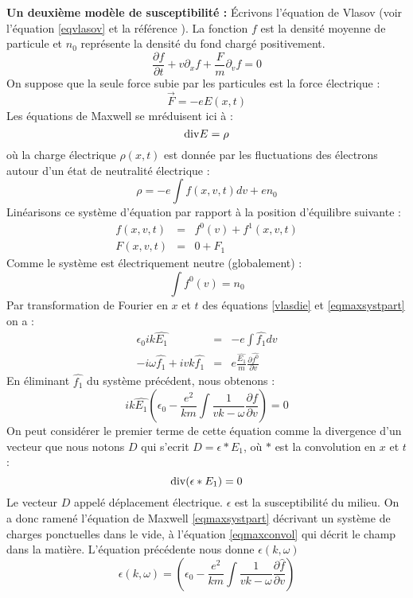 \documentclass[12pt]{book}
\begin{document}
\begin{exmp}{\bf Un deuxi\`eme mod\`ele de susceptibilit\'e :}
\'Ecrivons l'\'equation de Vlasov (voir l'\'equation \ref{eqvlasov} et la
r\'ef\'erence \cite{ph:physt:Diu89}).
La fonction $f$ est la densit\'e moyenne de particule et $n_0$
repr\'esente la densit\'e du fond charg\'e positivement.
\begin{equation}\label{vlasdie}
\frac{\partial f}{\partial t}+{v}\partial_x f+\frac{F}{m}\partial_v f= 0
\end{equation}
On suppose que la seule force subie par les particules est la force
\'electrique :
\begin{equation}
\vec{F}=-eE(x,t)
\end{equation}
Les \'equations de Maxwell se mr\'eduisent ici \`a :
\begin{equation}\label{eqmaxsystpart}
{\rm div} E=\rho
\end{equation}
o\`u la charge \'electrique $\rho(x,t)$ est donn\'ee par les fluctuations des
\'electrons autour d'un \'etat de neutralit\'e \'electrique :
\begin{equation}
\rho=-e\int f(x,v,t)dv+en_0
\end{equation}
Lin\'earisons ce syst\`eme d'\'equation par rapport \`a la position
d'\'equilibre suivante :
\begin{eqnarray}
f(x,v,t)&=&f^0(v)+f^1(x,v,t)\nonumber\\
F(x,v,t)&=&0+F_1
\end{eqnarray}
Comme le syst\`eme est \'electriquement neutre (globalement) :
\begin{equation}
\int f^0(v) = n_0
\end{equation}
Par transformation de Fourier en $x$ et $t$ des \'equations \ref{vlasdie} et
\ref{eqmaxsystpart} on a :
\begin{eqnarray}
\epsilon_0 ik \hat{E_1}&=&-e\int \hat{f_1} dv\\
-i\omega \hat{f_1}+ivk\hat{f_1}&=&e\frac{\hat{E_1}}{m} \frac{\partial
\hat{f^0}}{\partial v} 
\end{eqnarray}
En \'eliminant $\hat{f_1}$ du syst\`eme pr\'ec\'edent, nous obtenons :
\begin{equation}
ik\hat{E_1}(\epsilon_0 - \frac{e^2}{km}\int
\frac{1}{vk-\omega}\frac{\partial f}{\partial v})=0
\end{equation}
On peut consid\'erer le premier terme de cette \'equation comme la
divergence d'un vecteur que nous notons $D$ qui s'ecrit $D=\epsilon
*E_1$, o\`u $*$ est la convolution en $x$ et $t$ :
\begin{equation}\label{eqmaxconvol}
{\rm div}(\epsilon *E_1)=0
\end{equation}
Le vecteur $D$ appel\'e
d\'eplacement \'electrique. $\epsilon$ est la susceptibilit\'e du
milieu. 
On a donc ramen\'e l'\'equation de Maxwell \ref{eqmaxsystpart}
d\'ecrivant un syst\`eme de charges ponctuelles dans le vide, \`a
l'\'equation  \ref{eqmaxconvol} qui d\'ecrit le champ dans la
mati\`ere. L'\'equation pr\'ec\'edente nous donne $\epsilon (k,\omega)$
\begin{equation}
\epsilon (k,\omega)=(\epsilon_0 - \frac{e^2}{km}\int
\frac{1}{vk-\omega}\frac{\partial \hat{f}}{\partial v})
\end{equation}
\end{exmp}
\end{document}
